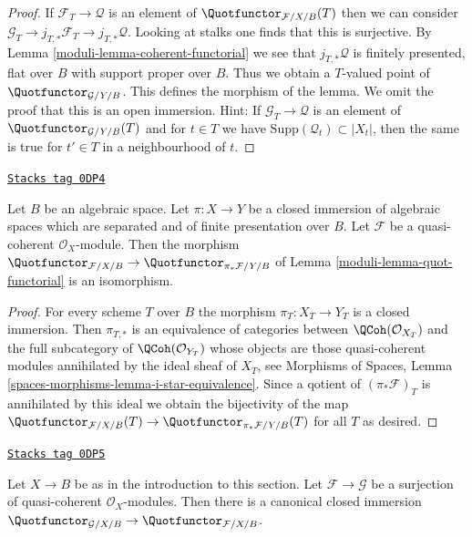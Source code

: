 \begin{proof}

If $\mathcal{F}_T \to \mathcal{Q}$ is an element of
$\Quotfunctor_{\mathcal{F}/X/B}(T)$ then we can consider
$\mathcal{G}_T \to j_{T, *}\mathcal{F}_T \to j_{T, *}\mathcal{Q}$.
Looking at stalks one finds that this is surjective.
By Lemma \ref{moduli-lemma-coherent-functorial}
we see that $j_{T, *}\mathcal{Q}$ is finitely presented, flat over $B$
with support proper over $B$. Thus we obtain a $T$-valued
point of $\Quotfunctor_{\mathcal{G}/Y/B}$.
This defines the morphism of the lemma.
We omit the proof that this is an open immersion. Hint:
If $\mathcal{G}_T \to \mathcal{Q}$ is an element of
$\Quotfunctor_{\mathcal{G}/Y/B}(T)$
and for $t \in T$ we have $\text{Supp}(\mathcal{Q}_t) \subset |X_t|$,
then the same is true for $t' \in T$ in a neighbourhood of $t$.
\end{proof}

\begin{lemma}
\label{moduli-lemma-quot-closed}
\href{https://stacks.math.columbia.edu/tag/0DP4}{\texttt{Stacks tag 0DP4}}

Let $B$ be an algebraic space. Let $\pi : X \to Y$ be a closed immersion
of algebraic spaces which are separated and of finite presentation over $B$.
Let $\mathcal{F}$ be a quasi-coherent $\mathcal{O}_X$-module.
Then the morphism
$\Quotfunctor_{\mathcal{F}/X/B} \to \Quotfunctor_{\pi_*\mathcal{F}/Y/B}$ of
Lemma \ref{moduli-lemma-quot-functorial} is an isomorphism.
\end{lemma}

\begin{proof}
For every scheme $T$ over $B$ the morphism $\pi_T : X_T \to Y_T$
is a closed immersion. Then $\pi_{T, *}$ is an equivalence of
categories between $\QCoh(\mathcal{O}_{X_T})$ and the full subcategory
of $\QCoh(\mathcal{O}_{Y_T})$ whose objects are those quasi-coherent
modules annihilated by the ideal sheaf of $X_T$, see
Morphisms of Spaces, Lemma \ref{spaces-morphisms-lemma-i-star-equivalence}.
Since a qotient of
$(\pi_*\mathcal{F})_T$ is annihilated by this ideal we obtain the
bijectivity of the map
$\Quotfunctor_{\mathcal{F}/X/B}(T) \to \Quotfunctor_{\pi_*\mathcal{F}/Y/B}(T)$
for all $T$ as desired.
\end{proof}

\begin{lemma}
\label{moduli-lemma-quot-quotient}
\href{https://stacks.math.columbia.edu/tag/0DP5}{\texttt{Stacks tag 0DP5}}

Let $X \to B$ be as in the introduction to this section. Let
$\mathcal{F} \to \mathcal{G}$ be a surjection of quasi-coherent
$\mathcal{O}_X$-modules. Then there is a canonical closed immersion
$\Quotfunctor_{\mathcal{G}/X/B} \to \Quotfunctor_{\mathcal{F}/X/B}$.
\end{lemma}

